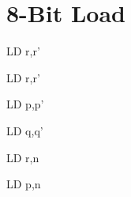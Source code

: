 \documentclass[twoside,openright,a4paper]{book}
\begin{document}
\section{8-Bit Load}

\begin{instrtable}	
	\begin{instruction}{LD r,r'}
			\Flags{\FN}{\FN}{\FN}{\FN}{\FN}{\FN}
	\end{instruction}

	\begin{instruction}{LD r,r'}
			\Flags{\FN}{\FN}{\FN}{\FN}{\FN}{\FN}
	\end{instruction}
		
	\begin{instruction}{LD p,p'}
			\Flags{\FN}{\FN}{\FN}{\FN}{\FN}{\FN}
		\SkipToOpCode
	\end{instruction}

	\begin{instruction}{LD q,q'}
			\Flags{\FN}{\FN}{\FN}{\FN}{\FN}{\FN}
	\SkipToOpCode
	\end{instruction}

	\begin{instruction}{LD r,n}
			\Flags{\FN}{\FN}{\FN}{\FN}{\FN}{\FN}
		\SkipToOpCode
	\end{instruction}

	\begin{instruction}{LD p,n}
			\Flags{\FN}{\FN}{\FN}{\FN}{\FN}{\FN}
		\SkipToOpCode
		\SkipToOpCode
	\end{instruction}
	

\end{instrtable}
\end{document}
